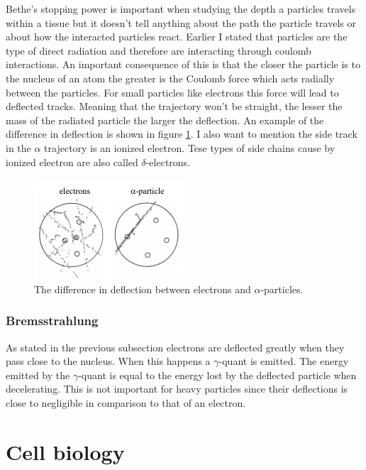\documentclass[jmp, amsmath, amssymb, reprint]{article}
\numberwithin{equation}{section}
\begin{document}
\begin{multicols}{2}
Bethe's stopping power is important when studying the depth a particles travels within a tissue but it doesn't tell anything about the path the particle travels or about how the interacted particles react. Earlier I stated that particles are the type of direct radiation and therefore are interacting through coulomb interactions. An important consequence of this is that the closer the particle is to the nucleus of an atom the greater is the Coulomb force which acts radially between the particles. For small particles like electrons this force will lead to deflected tracks. Meaning that the trajectory won't be straight, the lesser the mass of the radiated particle the larger the deflection. An example of the difference in deflection is shown in figure \ref{fig:scattering}. I also want to mention the side track in the \(\alpha\) trajectory is an ionized electron. Tese types of side chains cause by ionized electron are also called \(\delta\)-electrons.

\begin{figure}[H]
	\centering
  	\includegraphics[width=0.50\textwidth]{scattering.png}
	\caption{The difference in deflection between electrons and \(\alpha\)-particles.}
	\label{fig:scattering}
\end{figure}

\subsubsection{Bremsstrahlung}

As stated in the previous subsection electrons are deflected greatly when they pass close to the nucleus. When this happens a \(\gamma\)-quant is emitted. The energy emitted by the \(\gamma\)-quant is equal to the energy lost by the deflected particle when decelerating. This is not important for heavy particles since their deflections is close to negligible in comparison to that of an electron.

\newpage

\section{Cell biology}


\end{multicols}
\end{document}
